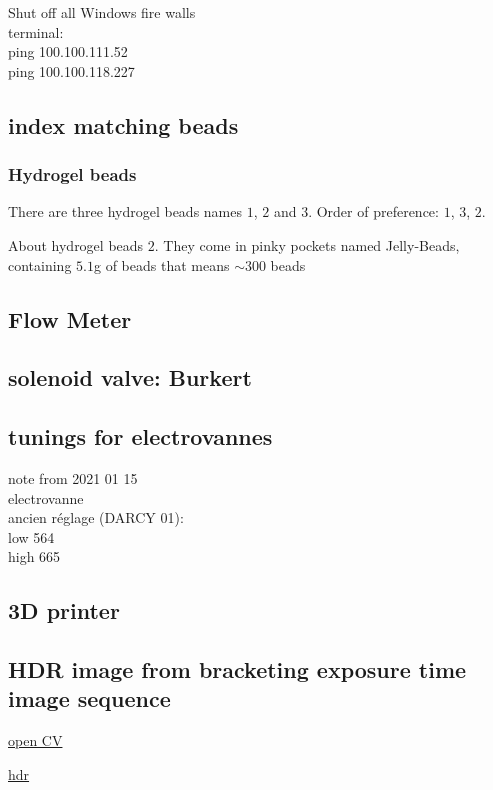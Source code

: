 \documentclass[lineno]{jfm}
\begin{document}
Shut off all Windows fire walls\\
terminal:\\
ping 100.100.111.52\\
ping 100.100.118.227\\

\subsection{index matching beads}
\subsubsection{Hydrogel beads}
There are three hydrogel beads names $1$, $2$ and $3$.
Order of preference: $1$, $3$, $2$.

About hydrogel beads $2$. They come in pinky pockets named Jelly-Beads, containing $5.1$g of beads that means $\sim300$ beads
\subsection{Flow Meter}

\subsection{solenoid valve: Burkert}

\subsection{tunings for electrovannes}

note from 2021 01 15\\
electrovanne\\
ancien réglage (DARCY 01):\\
low  564 \\
high 665\\


\subsection{3D printer}

\subsection{HDR image from bracketing exposure time image sequence}


\href{https://docs.opencv.org/master/d3/db7/tutorial_hdr_imaging.html}{open CV}


\href{https://towardsdatascience.com/hdr-imaging-what-is-an-hdr-image-anyway-bdf05985492c}{hdr}
\end{document}
